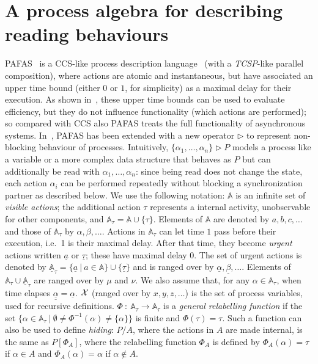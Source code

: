 \documentclass[copyright,creativecommons]{eptcs}
\newcommand{\B}{{\mathbb A}} \newcommand{\Bt}{\B_{\tau}} \newcommand{\X}{{\cal X}}
\newcommand{\rop}{\triangleright}
\begin{document}
\section{A process algebra for describing reading
behaviours}\label{PAFAS-s}
PAFAS~\cite{CVJ02} is a CCS-like process description language~\cite{Mil89}
(with a {\em TCSP}-like parallel composition), where actions are atomic and
instantaneous, but have associated an upper time bound (either $0$ or $1$,
for simplicity) as a maximal delay for their execution. As shown
in~\cite{CVJ02}, these upper time bounds can be used to evaluate
efficiency, but they do not influence functionality (which actions are
performed); so compared with CCS also PAFAS treats the full functionality
of asynchronous systems. In~\cite{CDV08tr}, PAFAS has been extended with a
new operator $\rop$ to represent non-blocking behaviour of processes.
Intuitively, $\{\alpha_1, \ldots, \alpha_n\}\rop P$ models a process like a
variable or a more complex data structure that behaves as $P$ but can
additionally be read with $\alpha_1,\ldots, \alpha_n$: since being read
does not change the state, each action $\alpha_i$ can be performed
repeatedly without blocking a synchronization partner as described below.
We use the following notation: $\B$ is an infinite set of \emph{visible
actions}; the additional action $\tau$ represents a internal activity,
unobservable for other components, and $\Bt=\B\cup\{\tau\}$. Elements of
$\B$ are denoted by $a,b,c,\dots$ and those of $\Bt$ by
$\alpha,\beta,\dots$. Actions in $\Bt$ can let time $1$ pass before their
execution, i.e.\ 1 is their maximal delay. After that time, they become
\emph{urgent} actions written $\underline{a}$ or $\underline{\tau}$; these
have maximal delay 0. The set of urgent actions is denoted by
$\underline{\B}_\tau = \{\underline{a} \:|\: a \in \B \}\cup \{
\underline{\tau} \}$ and is ranged over by
$\underline{\alpha},\underline{\beta},\dots$. Elements of $\Bt \cup
\underline{\B}_\tau$ are ranged over by $\mu$ and $\nu$. We also assume
that, for any $\alpha \in \Bt$, when time elapses $\underline{\underline{\alpha}} =
\underline{\alpha}$. $\X$ (ranged over by $x, y, z, \ldots$) is the set of
process variables, used for recursive definitions. $\Phi \: : \: \Bt
\rightarrow \Bt$ is a {\it general relabelling function} if the set $\{
\alpha \in \Bt \: | \: \emptyset \neq \Phi ^{-1}(\alpha) \neq \{ \alpha
\}\}$ is finite and $\Phi(\tau)= \tau$. Such a function can also be used to
define {\em hiding}: $P/A$, where the actions in $A$ are made internal, is
the same as $P[\Phi_A]$, where the relabelling function $\Phi_A$ is defined
by $\Phi_A(\alpha)= \tau$ if $\alpha \in A$ and $\Phi_A(\alpha)=\alpha$ if
$\alpha \notin A$. 
\end{document}
